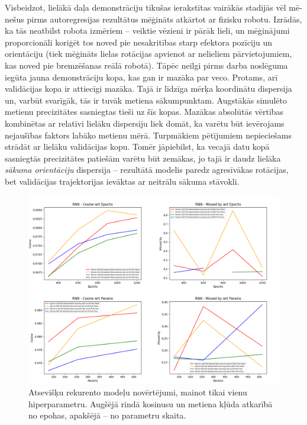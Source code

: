 \documentclass[12pt, a4paper]{article}
\numberwithin{equation}{section} %
\begin{document}
Visbeidzot, lielākā daļa demonstrāciju tikušas ierakstītas vairākās stadijās vēl mē-nešus pirms autoregresijas rezultātus mēģināts atkārtot ar fizisku robotu. Izrādās, ka tās neatbilst robota izmēriem -- veiktie vēzieni ir pārāk lieli, un mēģinājumi proporcionāli koriģēt tos noved pie nesakritības starp efektora pozīciju un orientāciju (tiek mēģināts lielas rotācijas apvienot ar nelieliem pārvietojumiem, kas noved pie bremzēšanas reālā robotā). Tāpēc neilgi pirms darba noslēguma iegūta jauna demonstrāciju kopa, kas gan ir mazāka par veco. Protams, arī validācijas kopa ir attiecīgi mazāka.  Tajā ir līdzīga mērķa koordinātu dispersija un, varbūt svarīgāk, tās ir tuvāk metiena sākumpunktam. Augstākās simulēto metienu precizitātes sasniegtas tieši uz šīs kopas. Mazākas absolūtās vērtības kombinētas ar relatīvi lielāku dispersiju liek domāt, ka varētu būt ievērojams nejaušības faktors labāko metienu mērā. Turpmākiem pētījumiem nepieciešams strādāt ar lielāku validācijas kopu. Tomēr jāpiebilst, ka vecajā datu kopā sasniegtās precizitātes patiešām varētu būt zemākas, jo tajā ir daudz lielāka \textit{sākuma orientāciju} dispersija -- rezultātā modelis paredz agresīvākas rotācijas, bet validācijas trajektorijas ievāktas ar neitrālu sākuma stāvokli.

\begin{figure}[t!]
    \centering
    \includegraphics[width=16cm,page=1]{../img/rnn-independent-params-epoch.png}
    \caption{Atsevišķu rekurento modeļu novērtējumi, mainot tikai vienu hiperparametru. Augšējā rindā kosinusu un metiena kļūda atkarībā no epohas, apakšējā -- no parametru skaita.}
\end{figure}
\end{document}
